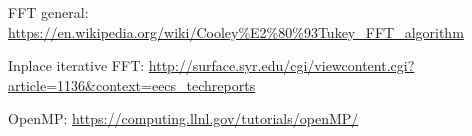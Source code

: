 FFT general:
\url{https://en.wikipedia.org/wiki/Cooley%E2%80%93Tukey_FFT_algorithm}

Inplace iterative FFT:
\url{http://surface.syr.edu/cgi/viewcontent.cgi?article=1136&context=eecs_techreports}

OpenMP: 
\url{https://computing.llnl.gov/tutorials/openMP/}